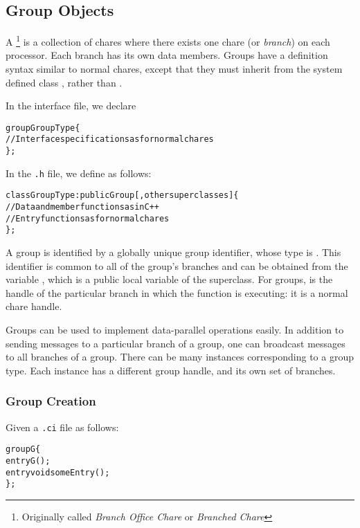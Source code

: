 \subsection{Group Objects}

A \footnote{Originally called {\em Branch Office Chare} or 
{\em Branched Chare}} is a collection of chares where 
there exists one chare (or {\sl branch}) on each
processor.   Each branch has its own data members.  Groups have
a definition syntax similar to normal chares, except that they must
inherit from the system defined class , rather than
.

In the interface file, we declare

\begin{alltt}
 group GroupType \{
   // Interface specifications as for normal chares
 \};
\end{alltt}

In the \texttt{.h} file, we define  as follows:

\begin{alltt}
 class GroupType : public Group [,other superclasses ] \{
  // Data and member functions as in C++
  // Entry functions as for normal chares
 \};
\end{alltt}

A group is identified by a globally unique group identifier, whose type is
. This identifier is common to all of the group's branches and
can be obtained from the variable , which is a public local
variable of the  superclass.  For groups,  is the
handle of the particular branch in which the function is executing: it is a
normal chare handle.

Groups can be used to implement data-parallel operations easily.  In addition
to sending messages to a particular branch of a group, one can broadcast
messages to all branches of a group.  There can be many instances corresponding
to a group type.  Each instance has a different group handle, and its own set
of branches.

\subsubsection{Group Creation}

Given a \texttt{.ci} file as follows:

\begin{alltt}
group G \{
  entry G();
  entry void someEntry();
\};
\end{alltt}

